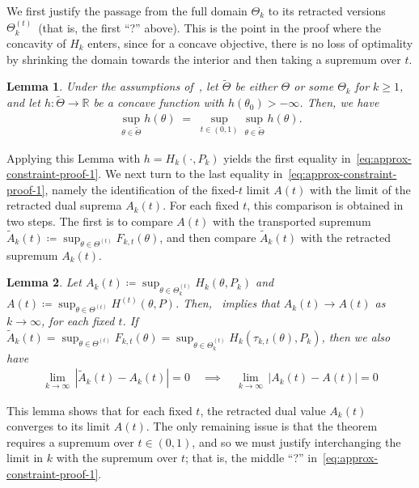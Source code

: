 \documentclass{article}
\theoremstyle{plain}
\newtheorem{lemma}[lemma]{Lemma}
\theoremstyle{definition}
\newcommand{\R}{\mathbb{R}}
\begin{document}
We first justify the passage from the full  domain $\Theta_k$ to its retracted versions $\Theta^{(t)}_k$~(that is, the first ``?'' above). This is the point in the proof where the concavity of $H_k$ enters, since for a concave objective, there is no loss of optimality by shrinking the domain towards the interior and then taking a supremum over $t$. 
\begin{lemma}
    \label{lemma:approx-constraint-interchange-1} Under the assumptions of~, let $\widetilde{\Theta}$ be either $\Theta$ or some $\Theta_k$ for $k \geq 1$, and let $h:\widetilde{\Theta} \to \R$ be a concave function with $h(\theta_0)> -\infty$. Then, we have 
    \begin{align}
        \sup_{\theta \in \widetilde{\Theta}} h(\theta) \; = \; \sup_{t \in (0,1)} \sup_{\theta \in \widetilde{\Theta}} h(\theta). 
    \end{align} 
\end{lemma}
Applying this Lemma with $h = H_k(\cdot, P_k)$ yields the first equality in~\eqref{eq:approx-constraint-proof-1}. We next turn to the last equality in~\eqref{eq:approx-constraint-proof-1}, namely the identification of the fixed-$t$ limit $A(t)$ with the limit of the retracted dual suprema $A_k(t)$. For each fixed $t$, this comparison is obtained in two steps. The first is to compare $A(t)$ with the transported supremum $\widetilde{A}_k(t) \coloneqq \sup_{\theta \in \Theta^{(t)}} F_{k,t}(\theta)$, and then compare $\widetilde{A}_k(t)$ with the retracted supremum $A_k(t)$. 
\begin{lemma}
    \label{lemma:approx-constraint-interchange-2} Let $A_k(t) \coloneqq \sup_{\theta \in \Theta_k^{(t)}}H_k(\theta, P_k)$ and $A(t) \coloneqq \sup_{\theta \in \Theta^{(t)}}H^{(t)}(\theta, P)$. Then,~ implies that $A_k(t) \to A(t)$ as $k \to \infty$, for each fixed $t$. If $\widetilde{A}_k(t) = \sup_{\theta \in \Theta^{(t)}} F_{k,t}(\theta) =  \sup_{\theta \in \Theta_k^{(t)}} H_k(\tau_{k,t}(\theta), P_k)$, then we also have 
    \begin{align}
        \lim_{k \to \infty} \, \left \lvert \widetilde{A}_k(t) - A_k(t) \right\rvert = 0 \quad \implies \quad \lim_{k \to \infty} \, \left \lvert {A}_k(t) - A(t) \right\rvert = 0
    \end{align}
\end{lemma}
This lemma shows that for each fixed $t$, the retracted dual value $A_k(t)$ converges to its limit $A(t)$. The only remaining issue is that the theorem requires a supremum over $t \in (0,1)$, and so we must justify interchanging the limit in $k$ with the supremum over $t$; that is, the middle ``?'' in~\eqref{eq:approx-constraint-proof-1}. 
\end{document}
